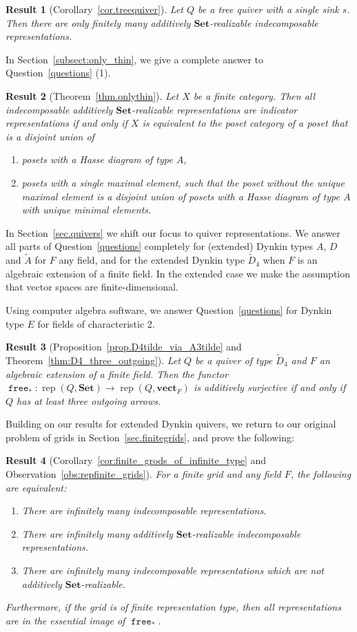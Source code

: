 \documentclass[a4paper]{amsart}
\theoremstyle{plain}
\newtheorem{resultx}{Result}
\theoremstyle{definition}
\theoremstyle{remark}
\newcommand{\funct}[1]{\operatorname{\mathtt{#1}}}
\newcommand{\Set}{\mathbf{Set}}
\newcommand{\vectF}{\mathbf{vect}_F}
\DeclareMathOperator{\rep}{rep}
\begin{document}
\begin{resultx}[Corollary~\ref{cor.treequiver}]
Let \( Q \) be a tree quiver with a single sink $s$. Then there are only finitely many additively $\Set$-realizable indecomposable representations.
\end{resultx}
In Section~\ref{subsect:only_thin}, we give a complete answer to Question~\ref{questions} (1).
\begin{resultx}[Theorem~\ref{thm.onlythin}]
Let \( X \) be a finite category. Then all indecomposable additively \( \Set \)-realizable representations are indicator representations if and only if \( X \) is equivalent to the poset category of a poset that is a disjoint union of
\begin{enumerate}
\item posets with a Hasse diagram of type \( A \),
\item posets with a single maximal element, such that the poset without the unique maximal element is a disjoint union of posets with a Hasse diagram of type \( A \) with unique minimal elements.
\end{enumerate}
\end{resultx}
In Section~\ref{sec.quivers} we shift our focus to quiver representations. We answer all parts of Question~\ref{questions} completely for (extended) Dynkin types $A$, $D$ and $\tilde{A}$ for $F$ any field, and for the extended Dynkin type $\tilde{D}_4$ when $F$ is an algebraic extension of a finite field. In the extended case we make the assumption that vector spaces are finite-dimensional. 

Using computer algebra software, we answer Question~\ref{questions} for Dynkin type $E$ for fields of characteristic 2. 
\begin{resultx}[Proposition~\ref{prop.D4tilde_via_A3tilde} and Theorem~\ref{thm:D4_three_outgoing}]
Let $Q$ be a quiver of type $\tilde{D}_4$ and $F$ an algebraic extension of a finite field. Then the functor $\funct{free}_* \colon \rep(Q, \Set)\to \rep(Q, \vectF)$ is additively surjective if and only if $Q$ has at least three outgoing arrows. 
\end{resultx}

Building on our results for extended Dynkin quivers, we return to our original problem of grids in Section~\ref{sec.finitegrids}, and prove the following:

\begin{resultx}[Corollary~\ref{cor:finite_grods_of_infinite_type} and Observation~\ref{obs:repfinite_grids}]
For a finite grid and any field $F$, the following are equivalent:
\begin{enumerate}
\item There are infinitely many indecomposable representations.
\item There are infinitely many additively \( \Set \)-realizable indecomposable representations.
\item There are infinitely many indecomposable representations which are not additively \( \Set \)-realizable.
\end{enumerate}
Furthermore, if the grid is of finite representation type, then all representations are in the essential image of \( \funct{free}_* \).
\end{resultx}
\end{document}
